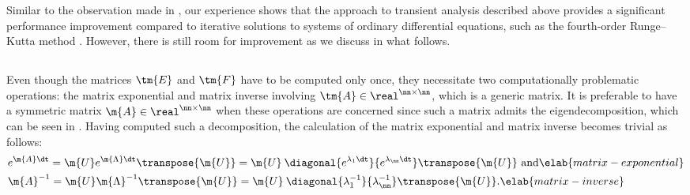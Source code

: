 Similar to the observation made in \cite{thiele2011}, our experience shows that
the approach to transient analysis described above provides a significant
performance improvement compared to iterative solutions to systems of ordinary
differential equations, such as the fourth-order Runge--Kutta method
\cite{press2007}. However, there is still room for improvement as we discuss in
what follows.

\subsection{\solutiontitle}

Even though the matrices $\tm{E}$ and $\tm{F}$ have to be computed only once,
they necessitate two computationally problematic operations: the matrix
exponential and matrix inverse involving $\tm{A} \in \real^{\nn \times \nn}$,
which is a generic matrix. It is preferable to have a symmetric matrix $\m{A}
\in \real^{\nn \times \nn}$ when these operations are concerned since such a
matrix admits the eigendecomposition, which can be seen in
. Having computed such a decomposition, the calculation
of the matrix exponential and matrix inverse becomes trivial as follows:
\begin{align}
  & e^{\m{A} \dt}
  = \m{U} e^{\m{\Lambda} \dt} \transpose{\m{U}}
  = \m{U} \: \diagonal{e^{\lambda_1 \dt}}{e^{\lambda_\nn \dt}} \transpose{\m{U}} \text{ and} \elab{matrix-exponential} \\
  & \m{A}^{-1}
  = \m{U} \m{\Lambda}^{-1} \transpose{\m{U}}
  = \m{U} \: \diagonal{\lambda_1^{-1}}{\lambda_\nn^{-1}} \transpose{\m{U}}. \elab{matrix-inverse}
\end{align}

